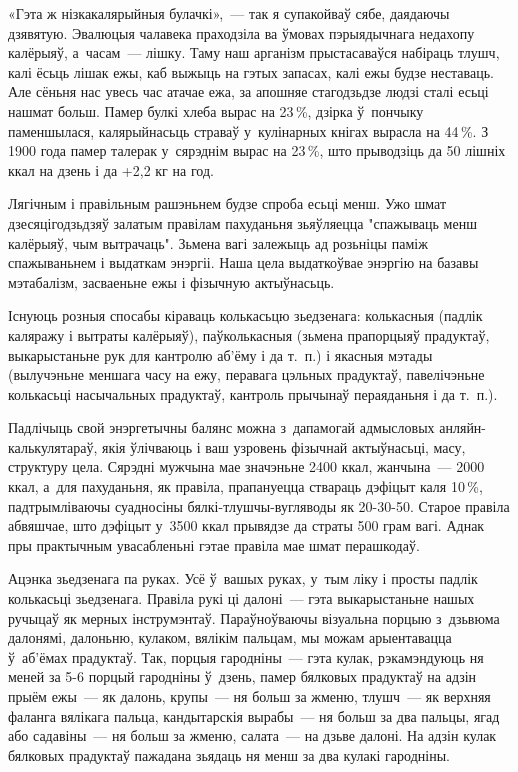 «Гэта ж нізкакалярыйныя булачкі»,~--- так я супакойваў сябе, даядаючы дзявятую. Эвалюцыя чалавека праходзіла ва ўмовах пэрыядычнага недахопу калёрыяў, а~часам~--- лішку. Таму наш арганізм прыстасаваўся набіраць тлушч, калі ёсьць лішак ежы, каб выжыць на гэтых запасах, калі ежы будзе неставаць. Але сёньня нас увесь час атачае ежа, за апошняе стагодзьдзе людзі сталі есьці нашмат больш. Памер булкі хлеба вырас на 23\,\%, дзірка ў~пончыку паменшылася, калярыйнасьць страваў у~кулінарных кнігах вырасла на 44\,\%. З 1900 года памер талерак у~сярэднім вырас на 23\,\%, што прыводзіць да 50 лішніх ккал на дзень і да +2,2 кг на год.

Лягічным і правільным рашэньнем будзе спроба есьці менш. Ужо шмат дзесяцігодзьдзяў залатым правілам пахуданьня зьяўляецца "спажываць менш калёрыяў, чым вытрачаць". Зьмена вагі залежыць ад розьніцы паміж спажываньнем і выдаткам энэргіі. Наша цела выдаткоўвае энэргію на базавы мэтабалізм, засваеньне ежы і фізычную актыўнасьць.

Існуюць розныя спосабы кіраваць колькасьцю зьедзенага: колькасныя (падлік каляражу і вытраты калёрыяў), паўколькасныя (зьмена прапорцыяў прадуктаў, выкарыстаньне рук для кантролю аб'ёму і да т.~п.) і якасныя мэтады (вылучэньне меншага часу на ежу, перавага цэльных прадуктаў, павелічэньне колькасьці насычальных прадуктаў, кантроль прычынаў пераяданьня і да т.~п.).

Падлічыць свой энэргетычны балянс можна з~дапамогай адмысловых анляйн-калькулятараў, якія ўлічваюць і ваш узровень фізычнай актыўнасьці, масу, структуру цела. Сярэдні мужчына мае значэньне 2400 ккал, жанчына~--- 2000 ккал, а~для пахуданьня, як правіла, прапануецца ствараць дэфіцыт каля 10\,\%, падтрымліваючы суадносіны бялкі-тлушчы-вугляводы як 20-30-50. Старое правіла абвяшчае, што дэфіцыт у~3500 ккал прывядзе да страты 500 грам вагі. Аднак пры практычным увасабленьні гэтае правіла мае шмат перашкодаў.

Ацэнка зьедзенага па руках. Усё ў~вашых руках, у~тым ліку і просты падлік колькасьці зьедзенага. Правіла рукі ці далоні~--- гэта выкарыстаньне нашых ручыцаў як мерных інструмэнтаў. Параўноўваючы візуальна порцыю з~дзьвюма далонямі, далоньню, кулаком, вялікім пальцам, мы можам арыентавацца ў~аб'ёмах прадуктаў. Так, порцыя гародніны~--- гэта кулак, рэкамэндуюць ня меней за 5-6 порцый гародніны ў~дзень, памер бялковых прадуктаў на адзін прыём ежы~--- як далонь, крупы~--- ня больш за жменю, тлушч~--- як верхняя фаланга вялікага пальца, кандытарскія вырабы~--- ня больш за два пальцы, ягад або садавіны~--- ня больш за жменю, салата~--- на дзьве далоні. На адзін кулак бялковых прадуктаў пажадана зьядаць ня менш за два кулакі гародніны.

